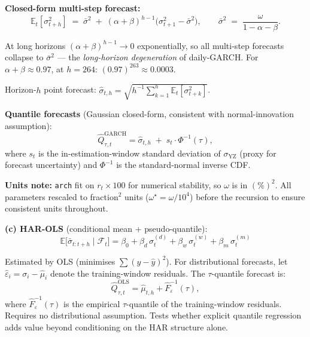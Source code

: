 \documentclass[10pt,a4paper]{article}
\begin{document}
\textbf{Closed-form multi-step forecast:}
\begin{equation*}
\mathbb{E}_t[\sigma_{t+h}^2]
\;=\; \bar{\sigma}^2 \;+\; (\alpha+\beta)^{h-1}\bigl(\sigma_{t+1}^2 - \bar{\sigma}^2\bigr),
\qquad
\bar{\sigma}^2 \;=\; \frac{\omega}{1-\alpha-\beta}.
\end{equation*}

At long horizons $(\alpha+\beta)^{h-1} \to 0$ exponentially, so all
multi-step forecasts collapse to $\bar{\sigma}^2$ --- the
\emph{long-horizon degeneration} of daily-GARCH. For $\alpha+\beta \approx 0.97$,
at $h=264$: $(0.97)^{263} \approx 0.0003$.

Horizon-$h$ point forecast:
$\hat{\sigma}_{t,h} = \sqrt{h^{-1}\sum_{k=1}^{h}\mathbb{E}_t[\sigma_{t+k}^2]}$.

\textbf{Quantile forecasts} (Gaussian closed-form, consistent with normal-innovation
assumption):
\begin{equation*}
\hat{Q}_{\tau,t}^{\text{GARCH}} = \hat{\sigma}_{t,h} \;+\; s_t \cdot \Phi^{-1}(\tau),
\end{equation*}
where $s_t$ is the in-estimation-window standard deviation of $\sigma_{\text{YZ}}$
(proxy for forecast uncertainty) and $\Phi^{-1}$ is the standard-normal inverse CDF.

\textbf{Units note:} \texttt{arch} fit on $r_t \times 100$ for numerical
stability, so $\omega$ is in $(\%)^2$. All parameters rescaled to fraction$^2$
units ($\omega^\star = \omega/10^4$) before the recursion to ensure consistent
units throughout.

\medskip
\textbf{(c) HAR-OLS} (conditional mean + pseudo-quantile):
\begin{equation*}
\mathbb{E}\!\bigl[\bar{\sigma}_{t:t+h}\mid\mathcal{F}_t\bigr]
= \beta_0 + \beta_d\,\sigma_t^{(d)} + \beta_w\,\sigma_t^{(w)} + \beta_m\,\sigma_t^{(m)}
\end{equation*}

Estimated by OLS (minimises $\sum(y - \hat{y})^2$). For distributional
forecasts, let $\hat{\varepsilon}_i = \sigma_i - \hat{\mu}_i$ denote the
training-window residuals. The $\tau$-quantile forecast is:
\begin{equation*}
\hat{Q}_{\tau,t}^{\text{OLS}} = \hat{\mu}_{t,h} + \hat{F}^{-1}_{\varepsilon}(\tau),
\end{equation*}
where $\hat{F}^{-1}_{\varepsilon}(\tau)$ is the empirical $\tau$-quantile of
the training-window residuals. Requires no distributional assumption. Tests
whether explicit quantile regression adds value beyond conditioning on the
HAR structure alone.
\end{document}
